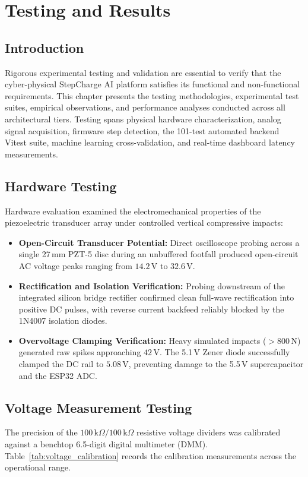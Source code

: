 \chapter{Testing and Results}

\section{Introduction}
Rigorous experimental testing and validation are essential to verify that the cyber-physical StepCharge AI platform satisfies its functional and non-functional requirements. This chapter presents the testing methodologies, experimental test suites, empirical observations, and performance analyses conducted across all architectural tiers. Testing spans physical hardware characterization, analog signal acquisition, firmware step detection, the 101-test automated backend Vitest suite, machine learning cross-validation, and real-time dashboard latency measurements.

\section{Hardware Testing}
Hardware evaluation examined the electromechanical properties of the piezoelectric transducer array under controlled vertical compressive impacts:
\begin{itemize}
    \item \textbf{Open-Circuit Transducer Potential:} Direct oscilloscope probing across a single 27\,mm PZT-5 disc during an unbuffered footfall produced open-circuit AC voltage peaks ranging from $14.2\,\text{V}$ to $32.6\,\text{V}$.
    \item \textbf{Rectification and Isolation Verification:} Probing downstream of the integrated silicon bridge rectifier confirmed clean full-wave rectification into positive DC pulses, with reverse current backfeed reliably blocked by the 1N4007 isolation diodes.
    \item \textbf{Overvoltage Clamping Verification:} Heavy simulated impacts ($>800\,\text{N}$) generated raw spikes approaching $42\,\text{V}$. The 5.1\,V Zener diode successfully clamped the DC rail to $5.08\,\text{V}$, preventing damage to the 5.5\,V supercapacitor and the ESP32 ADC.
\end{itemize}

\section{Voltage Measurement Testing}
The precision of the $100\,\text{k}\Omega / 100\,\text{k}\Omega$ resistive voltage dividers was calibrated against a benchtop 6.5-digit digital multimeter (DMM). Table~\ref{tab:voltage_calibration} records the calibration measurements across the operational range.

